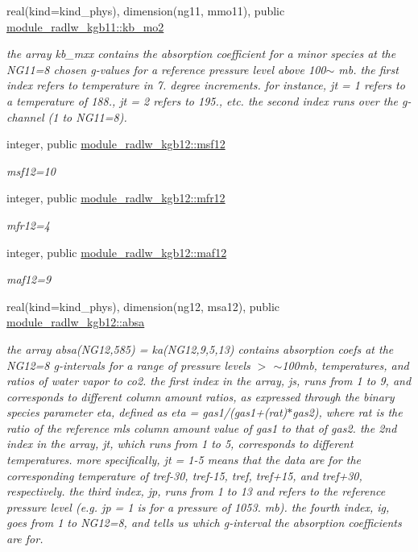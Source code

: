 \begin{Indent}
\begin{DoxyCompactItemize}
real(kind=kind\+\_\+phys), dimension(ng11, mmo11), public \hyperlink{group__module__radlw__kgbnn_gaebc48e152bb90794b6d0b426f6c5f9e4}{module\+\_\+radlw\+\_\+kgb11\+::kb\+\_\+mo2}
\begin{DoxyCompactList}\small\item\em the array kb\+\_\+mxx contains the absorption coefficient for a minor species at the N\+G11=8 chosen g-\/values for a reference pressure level above 100$\sim$ mb. the first index refers to temperature in 7. degree increments. for instance, jt = 1 refers to a temperature of 188., jt = 2 refers to 195., etc. the second index runs over the g-\/channel (1 to N\+G11=8). \end{DoxyCompactList}\item 
integer, public \hyperlink{group__module__radlw__kgbnn_ga3282a15ee0faaafd65509536a59e5b4f}{module\+\_\+radlw\+\_\+kgb12\+::msf12}
\begin{DoxyCompactList}\small\item\em msf12=10 \end{DoxyCompactList}\item 
integer, public \hyperlink{group__module__radlw__kgbnn_gacd751a2e48d0286e3d25a9b658a8367a}{module\+\_\+radlw\+\_\+kgb12\+::mfr12}
\begin{DoxyCompactList}\small\item\em mfr12=4 \end{DoxyCompactList}\item 
integer, public \hyperlink{group__module__radlw__kgbnn_ga9d7c05182e21605108bd65f47bb5569c}{module\+\_\+radlw\+\_\+kgb12\+::maf12}
\begin{DoxyCompactList}\small\item\em maf12=9 \end{DoxyCompactList}\item 
real(kind=kind\+\_\+phys), dimension(ng12, msa12), public \hyperlink{group__module__radlw__kgbnn_ga7600bfa19dde3b47d8479f5766ee0c93}{module\+\_\+radlw\+\_\+kgb12\+::absa}
\begin{DoxyCompactList}\small\item\em the array absa(\+N\+G12,585) = ka(\+N\+G12,9,5,13) contains absorption coefs at the N\+G12=8 g-\/intervals for a range of pressure levels $>$ $\sim$100mb, temperatures, and ratios of water vapor to co2. the first index in the array, js, runs from 1 to 9, and corresponds to different column amount ratios, as expressed through the binary species parameter eta, defined as eta = gas1/(gas1+(rat)$\ast$gas2), where rat is the ratio of the reference mls column amount value of gas1 to that of gas2. the 2nd index in the array, jt, which runs from 1 to 5, corresponds to different temperatures. more specifically, jt = 1-\/5 means that the data are for the corresponding temperature of tref-\/30, tref-\/15, tref, tref+15, and tref+30, respectively. the third index, jp, runs from 1 to 13 and refers to the reference pressure level (e.\+g. jp = 1 is for a pressure of 1053. mb). the fourth index, ig, goes from 1 to N\+G12=8, and tells us which g-\/interval the absorption coefficients are for. \end{DoxyCompactList}\item 

\end{DoxyCompactItemize}
\end{Indent}
